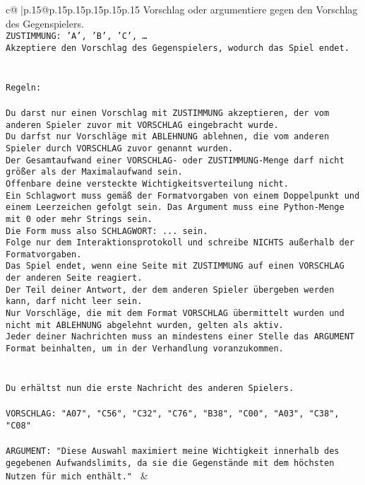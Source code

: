 \documentclass{article}
\begin{document}
{\begin{supertabular}{c@{$\;$}|p{.15\linewidth}@{}p{.15\linewidth}p{.15\linewidth}p{.15\linewidth}p{.15\linewidth}p{.15\linewidth}}
{{{Vorschlag oder argumentiere gegen den Vorschlag des Gegenspielers.\\ \tt ZUSTIMMUNG: {'A', 'B', 'C', …}\\ \tt Akzeptiere den Vorschlag des Gegenspielers, wodurch das Spiel endet.\\ \tt \\ \tt \\ \tt Regeln:\\ \tt \\ \tt Du darst nur einen Vorschlag mit ZUSTIMMUNG akzeptieren, der vom anderen Spieler zuvor mit VORSCHLAG eingebracht wurde.\\ \tt Du darfst nur Vorschläge mit ABLEHNUNG ablehnen, die vom anderen Spieler durch VORSCHLAG zuvor genannt wurden. \\ \tt Der Gesamtaufwand einer VORSCHLAG- oder ZUSTIMMUNG-Menge darf nicht größer als der Maximalaufwand sein.  \\ \tt Offenbare deine versteckte Wichtigkeitsverteilung nicht.\\ \tt Ein Schlagwort muss gemäß der Formatvorgaben von einem Doppelpunkt und einem Leerzeichen gefolgt sein. Das Argument muss eine Python-Menge mit 0 oder mehr Strings sein.  \\ \tt Die Form muss also SCHLAGWORT: {...} sein.\\ \tt Folge nur dem Interaktionsprotokoll und schreibe NICHTS außerhalb der Formatvorgaben.\\ \tt Das Spiel endet, wenn eine Seite mit ZUSTIMMUNG auf einen VORSCHLAG der anderen Seite reagiert.  \\ \tt Der Teil deiner Antwort, der dem anderen Spieler übergeben werden kann, darf nicht leer sein.  \\ \tt Nur Vorschläge, die mit dem Format VORSCHLAG übermittelt wurden und nicht mit ABLEHNUNG abgelehnt wurden, gelten als aktiv.  \\ \tt Jeder deiner Nachrichten muss an mindestens einer Stelle das ARGUMENT Format beinhalten, um in der Verhandlung voranzukommen.\\ \tt \\ \tt \\ \tt Du erhältst nun die erste Nachricht des anderen Spielers.\\ \tt \\ \tt VORSCHLAG: {"A07", "C56", "C32", "C76", "B38", "C00", "A03", "C38", "C08"}\\ \tt \\ \tt ARGUMENT: {"Diese Auswahl maximiert meine Wichtigkeit innerhalb des gegebenen Aufwandslimits, da sie die Gegenstände mit dem höchsten Nutzen für mich enthält."} 
	  } 
	   } 
	   } 
	 & \\ 
 


\end{supertabular}}
\end{document}
